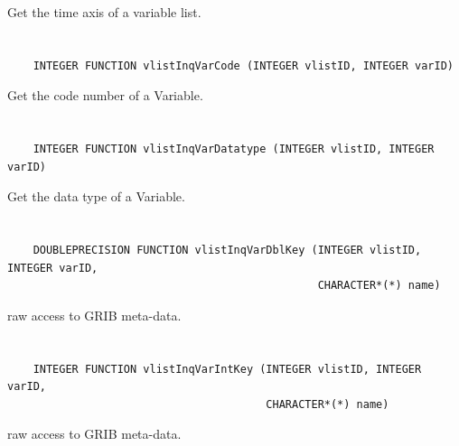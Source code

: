 Get the time axis of a variable list.


\section*{\tt {}}

\begin{verbatim}
    INTEGER FUNCTION vlistInqVarCode (INTEGER vlistID, INTEGER varID)
\end{verbatim}

Get the code number of a Variable.


\section*{\tt {}}

\begin{verbatim}
    INTEGER FUNCTION vlistInqVarDatatype (INTEGER vlistID, INTEGER varID)
\end{verbatim}

Get the data type of a Variable.


\section*{\tt {}}

\begin{verbatim}
    DOUBLEPRECISION FUNCTION vlistInqVarDblKey (INTEGER vlistID, INTEGER varID,
                                                CHARACTER*(*) name)
\end{verbatim}

raw access to GRIB meta-data.


\section*{\tt {}}

\begin{verbatim}
    INTEGER FUNCTION vlistInqVarIntKey (INTEGER vlistID, INTEGER varID,
                                        CHARACTER*(*) name)
\end{verbatim}

raw access to GRIB meta-data.


\section*{\tt {}}

